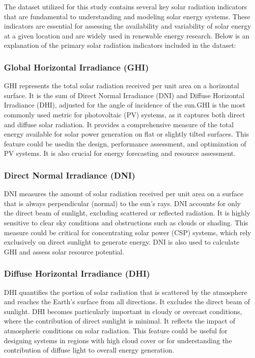 \documentclass[10pt,twocolumn]{article}
\begin{document}
The dataset utilized for this study contains several key solar radiation indicators that are fundamental to understanding and modeling solar energy systems. These indicators are essential for assessing the availability and variability of solar energy at a given location and are widely used in renewable energy research. Below is an explanation of the primary solar radiation indicators included in the dataset:

\subsubsection{Global Horizontal Irradiance (GHI)}
\begin{itemize}
     GHI represents the total solar radiation received per unit area on a horizontal surface. It is the sum of Direct Normal Irradiance (DNI) and Diffuse Horizontal Irradiance (DHI), adjusted for the angle of incidence of the sun.GHI is the most commonly used metric for photovoltaic (PV) systems, as it captures both direct and diffuse solar radiation. It provides a comprehensive measure of the total energy available for solar power generation on flat or slightly tilted surfaces. This feature could be usedin the design, performance assessment, and optimization of PV systems. It is also crucial for energy forecasting and resource assessment.
\end{itemize}

\subsubsection{Direct Normal Irradiance (DNI)}
\begin{itemize}
     DNI measures the amount of solar radiation received per unit area on a surface that is always perpendicular (normal) to the sun's rays. DNI accounts for only the direct beam of sunlight, excluding scattered or reflected radiation. It is highly sensitive to clear sky conditions and obstructions such as clouds or shading. This measure could be critical for concentrating solar power (CSP) systems, which rely exclusively on direct sunlight to generate energy. DNI is also used to calculate GHI and assess solar resource potential.
\end{itemize}

\subsubsection{Diffuse Horizontal Irradiance (DHI)}
\begin{itemize}
    DHI quantifies the portion of solar radiation that is scattered by the atmosphere and reaches the Earth's surface from all directions. It excludes the direct beam of sunlight. DHI becomes particularly important in cloudy or overcast conditions, where the contribution of direct sunlight is minimal. It reflects the impact of atmospheric conditions on solar radiation. This feature could be useful for designing systems in regions with high cloud cover or for understanding the contribution of diffuse light to overall energy generation.
\end{itemize}
\end{document}
